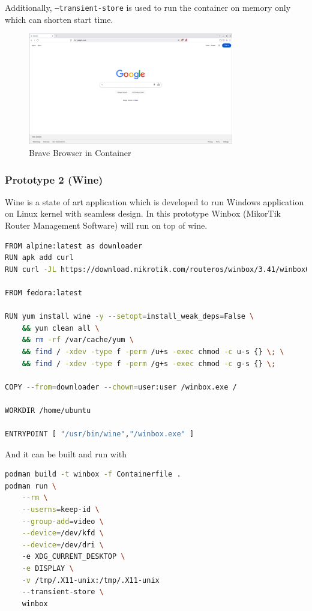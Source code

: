 \documentclass[journal,onecolumn]{IEEEtran}
\newcommand{\code}[1]{\texttt{#1}}
\begin{document}
Additionally, \code{--transient-store} is used to run the container on memory only which can shorten start time.

\begin{figure}[ht]
    \centering
    \includegraphics[width=0.8\textwidth]{proto-brave}
    \caption{Brave Browser in Container}
    \label{fig:proto-brave}
\end{figure}

\subsubsection{Prototype 2 (Wine)}
Wine is a state of art application which is developed to run Windows application on Linux kernel with seamless design. In this prototype Winbox (MikorTik Router Management Software) will  run on top of wine.

\begin{lstlisting}[language=Bash]
FROM alpine:latest as downloader
RUN apk add curl
RUN curl -JL https://download.mikrotik.com/routeros/winbox/3.41/winbox64.exe -o winbox.exe

FROM fedora:latest

RUN yum install wine -y --setopt=install_weak_deps=False \
    && yum clean all \
    && rm -rf /var/cache/yum \
    && find / -xdev -type f -perm /u+s -exec chmod -c u-s {} \; \
    && find / -xdev -type f -perm /g+s -exec chmod -c g-s {} \;

COPY --from=downloader --chown=user:user /winbox.exe /

WORKDIR /home/ubuntu

ENTRYPOINT [ "/usr/bin/wine","/winbox.exe" ]
\end{lstlisting}

And it can be built and run with 
\begin{lstlisting}[language=Bash]
podman build -t winbox -f Containerfile .
podman run \
    --rm \
    --userns=keep-id \
    --group-add=video \
    --device=/dev/kfd \
    --device=/dev/dri \ 
    -e XDG_CURRENT_DESKTOP \
    -e DISPLAY \
    -v /tmp/.X11-unix:/tmp/.X11-unix
    --transient-store \
    winbox
\end{lstlisting}
\end{document}
